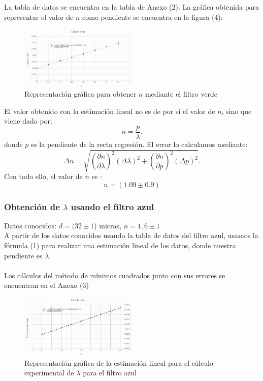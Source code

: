 \documentclass[11pt,letterpaper,twocolumn]{article}
\begin{document}
La tabla de datos se encuentra en la tabla de Anexo (2). La gráfica obtenida para representar el valor de $n$ como pendiente se encuentra en la figura (4):
\begin{figure}[H]
	\centering
	\includegraphics[width=0.5\textwidth]{imagen/grafican.png}
	\caption{Representación gráfica para obtener $n$ mediante el filtro verde}
	\label{fig:imagen-}
\end{figure}
El valor obtenido con la estimación lineal no es de por si el valor de $n$, sino que viene dado por:
\[
n=\frac{p}{\lambda}
.\] 
donde $p$ es la pendiente de la recta regresión. El error lo calculamos mediante:
\[
	\Delta n=\sqrt{\left( \frac{\partial n}{\partial \lambda}  \right) ^2 \left( \Delta \lambda \right) ^2+ \left( \frac{\partial n}{\partial p}  \right) ^2 \left( \Delta p \right) ^2} 
.\] 
Con todo ello, el valor de $n$ es :
\begin{equation}
	\boxed{n=\left( 1.09 \pm 0.9 \right) }
\end{equation}
\subsubsection{Obtención de $\lambda$ usando el filtro azul }
Datos conocidos: $d=(32 \pm 1 $) micras,  $n=1,6 \pm 1$\\
A partir de los datos conocidos usando la tabla de datos del filtro azul, usamos la fórmula (1) para realizar una estimación lineal de los datos, donde nuestra pendiente es  $\lambda$.\\
\\
Los cálculos del método de mínimos cuadrados junto con sus errores se encuentran en el Anexo (3)




\begin{figure}[H]
	\centering
	\includegraphics[width=0.50\textwidth]{imagen/grafical1.png }
	\caption{Representación gráfica de la estimación lineal para el cálculo experimental de $\lambda$ para el filtro azul}
	\label{fig:imagen-grafical1-png-}
\end{figure}
\end{document}

